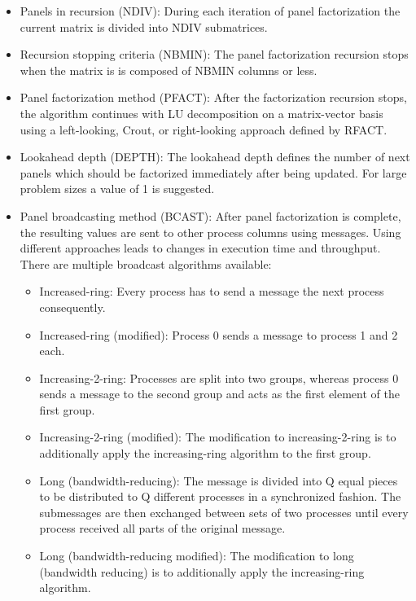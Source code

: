 \documentclass[10pt,twocolumn]{article}
\begin{document}
\begin{itemize}
\item Panels in recursion (NDIV): During each iteration of panel factorization the current matrix is divided into NDIV submatrices.

\item Recursion stopping criteria (NBMIN): The panel factorization recursion stops when the matrix is is composed of NBMIN columns or less.

\item Panel factorization method (PFACT): After the factorization recursion stops, the algorithm continues with LU decomposition on a matrix-vector basis using a left-looking, Crout, or right-looking approach defined by RFACT.

\item Lookahead depth (DEPTH): The lookahead depth defines the number of next panels which should be factorized immediately after being updated. For large problem sizes a value of 1 is suggested.

\item Panel broadcasting method (BCAST): After panel factorization is complete, the resulting values are sent to other process columns using messages. Using different approaches leads to changes in execution time and throughput. There are multiple broadcast algorithms available:
\begin{itemize}
\item Increased-ring: Every process has to send a message the next process consequently.
\item Increased-ring (modified): Process 0 sends a message to process 1 and 2 each. 
\item Increasing-2-ring: Processes are split into two groups, whereas process 0 sends a message to the second group and acts as the first element of the first group.
\item Increasing-2-ring (modified): The modification to increasing-2-ring is to additionally apply the increasing-ring algorithm to the first group.
\item Long (bandwidth-reducing): The message is divided into Q equal pieces to be distributed to Q different processes in a synchronized fashion. The submessages are then exchanged between sets of two processes until every process received all parts of the original message.
\item Long (bandwidth-reducing modified): The modification to long (bandwidth reducing) is to additionally apply the increasing-ring algorithm.
\end{itemize}


\end{itemize}
\end{document}
